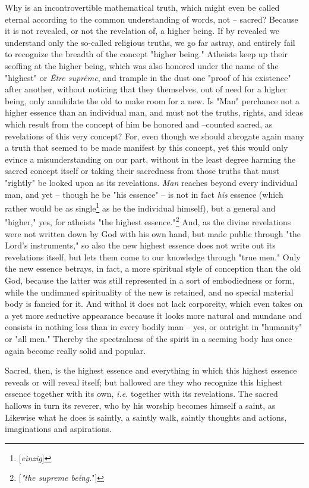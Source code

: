 \documentclass[a4paper]{book}
\begin{document}
Why is an incontrovertible mathematical truth, which might even be called 
eternal according to the common understanding of words, not -- sacred? Because 
it is not revealed, or not the revelation of, a higher being. If by revealed 
we understand only the so-called religious truths, we go far astray, and 
entirely fail to recognize the breadth of the concept "{}higher being."{} 
Atheists keep up their scoffing at the higher being, which was also honored 
under the name of the "{}highest"{} or \textit{\^Etre supr\^eme}, and trample 
in the dust one "{}proof of his existence"{} after another, without noticing 
that they themselves, out of need for a higher being, only annihilate the old 
to make room for a new. Is "{}Man"{} perchance not a higher essence than an 
individual man, and must not the truths, rights, and ideas which result from 
the concept of him be honored and --counted sacred, as revelations of this 
very concept? For, even though we should abrogate again many a truth that 
seemed to be made manifest by this concept, yet this would only evince a 
misunderstanding on our part, without in the least degree harming the sacred 
concept itself or taking their sacredness from those truths that must 
"{}rightly"{} be looked upon as its revelations. \textit{Man} reaches beyond 
every individual man, and yet -- though he be "{}his essence"{} -- is not in 
fact \textit{his} essence (which rather would be as 
single\footnote{[\textit{einzig}]} as he the individual himself), but a 
general and "{}higher,"{} yes, for atheists "{}the highest 
essence."{}\footnote{[\textit{"{}the supreme being}."{}]} And, as the divine 
revelations were not written down by God with his own hand, but made public 
through "{}the Lord's instruments,"{} so also the new highest essence does not 
write out its revelations itself, but lets them come to our knowledge through 
"{}true men."{} Only the new essence betrays, in fact, a more spiritual style 
of conception than the old God, because the latter was still represented in a 
sort of embodiedness or form, while the undimmed spirituality of the new is 
retained, and no special material body is fancied for it. And withal it does 
not lack corporeity, which even takes on a yet more seductive appearance 
because it looks more natural and mundane and consists in nothing less than in 
every bodily man -- yes, or outright in "{}humanity"{} or "{}all men."{} 
Thereby the spectralness of the spirit in a seeming body has once again become 
really solid and popular.

Sacred, then, is the highest essence and everything in which this highest 
essence reveals or will reveal itself; but hallowed are they who recognize 
this highest essence together with its own, \textit{i.e.} together with its 
revelations. The sacred hallows in turn its reverer, who by his worship 
becomes himself a saint, as Likewise what he does is saintly, a saintly walk, 
saintly thoughts and actions, imaginations and aspirations.
\end{document}
